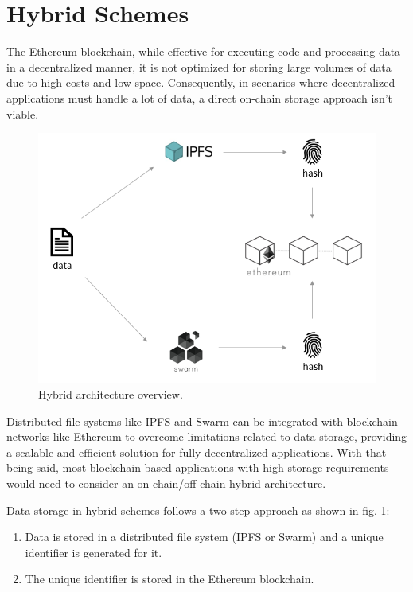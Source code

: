 \section{Hybrid Schemes}\label{sec:}
The Ethereum blockchain, while effective for executing code and processing data in a decentralized manner, it is not optimized for storing large volumes of data due to high costs and low space. Consequently, in scenarios where decentralized applications must handle a lot of data, a direct on-chain storage approach isn't viable.

\begin{figure}[htbp]
\centerline{\includegraphics[width=12cm]{figs/hybrid.png}}
\caption{Hybrid architecture overview.}
\label{fig: hybrid}
\end{figure}

Distributed file systems like IPFS and Swarm can be integrated with blockchain networks like Ethereum to overcome limitations related to data storage, providing a scalable and efficient solution for fully decentralized applications. With that being said, most blockchain-based applications with high storage requirements would need to consider an on-chain/off-chain hybrid architecture.

Data storage in hybrid schemes follows a two-step approach as shown in fig. \ref{fig: hybrid}:
\begin{enumerate}
\item Data is stored in a distributed file system (IPFS or Swarm) and a unique identifier is generated for it.
\item The unique identifier is stored in the Ethereum blockchain.
\end{enumerate}

